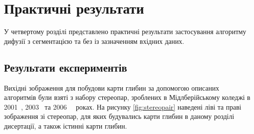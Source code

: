 \chapter{Практичні результати}

У четвертому розділі представлено практичні результати
застосування алгоритму дифузії з сегментацією
та без із зазначенням вхідних даних.

\section{Результати експериментів}

Вихідні зображення для побудови карти глибин
за допомогою описаних алгоритмів були взяті з набору стереопар,
зроблених в Мідлберійському коледжі в 2001~\cite{middlebury:ds:2001},
2003~\cite{middlebury:ds:2003}
та 2006~\cite{middlebury:ds:2006:1}~\cite{middlebury:ds:2006:2} роках.
На рисунку \ref{fig:stereopair} наведені ліві та праві зображення зі стереопар,
для яких будувались карти глибин в даному розділі дисертації,
а також істинні карти глибин.

